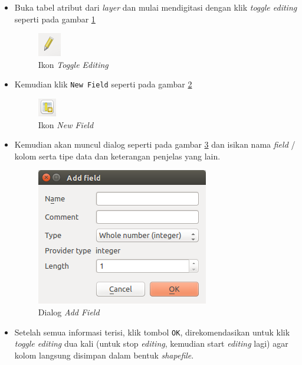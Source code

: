 \begin{itemize}

  \item Buka tabel atribut dari \textit{layer} dan mulai mendigitasi dengan klik \textit{toggle editing} seperti pada gambar \ref{fig:iconediting}
  
  \begin{figure}[H]
    \centering
    \includegraphics[scale=1]{./resources/042-icon-toggle-editing}
    \caption{Ikon \textit{Toggle Editing}}
    \label{fig:iconediting}
  \end{figure}  
  
  \item Kemudian klik \texttt{New Field} seperti pada gambar \ref{fig:iconnewfield}
  
  \begin{figure}[H]
    \centering
    \includegraphics[scale=1]{./resources/043-icon-new-field}
    \caption{Ikon \textit{New Field}}
    \label{fig:iconnewfield}
  \end{figure}
  
  \item Kemudian akan muncul dialog seperti pada gambar \ref{fig:addfielddialog} dan isikan nama \textit{field} / kolom serta tipe data dan keterangan penjelas yang lain.
  
  \begin{figure}[H]
    \centering
    \includegraphics[scale=1]{./resources/044-add-field-dialog}
    \caption{Dialog \textit{Add Field}}
    \label{fig:addfielddialog}
  \end{figure}
  
  \item Setelah semua informasi terisi, klik tombol \texttt{OK}, direkomendasikan untuk klik \textit{toggle editing} dua kali (untuk stop \textit{editing}, kemudian start \textit{editing} lagi) agar kolom langsung disimpan dalam bentuk \textit{shapefile}.

\end{itemize}

